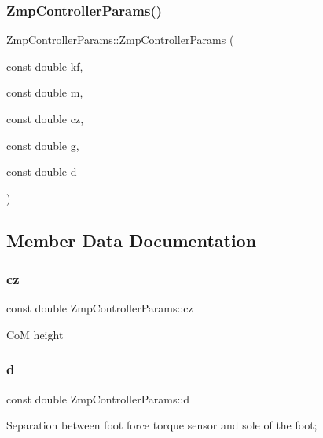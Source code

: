 \subsubsection{\texorpdfstring{Zmp\+Controller\+Params()}{ZmpControllerParams()}}
{\footnotesize\ttfamily Zmp\+Controller\+Params\+::\+Zmp\+Controller\+Params (\begin{DoxyParamCaption}\item[{const double}]{kf,  }\item[{const double}]{m,  }\item[{const double}]{cz,  }\item[{const double}]{g,  }\item[{const double}]{d }\end{DoxyParamCaption})\hspace{0.3cm}{\ttfamily [inline]}}



\subsection{Member Data Documentation}
\hypertarget{structZmpControllerParams_ae0d24b7bdae3eb228b9db827934d0e87}{}\label{structZmpControllerParams_ae0d24b7bdae3eb228b9db827934d0e87} 
\subsubsection{\texorpdfstring{cz}{cz}}
{\footnotesize\ttfamily const double Zmp\+Controller\+Params\+::cz}

CoM height \hypertarget{structZmpControllerParams_a00f5d68e5a1215bbe7b722375d95d243}{}\label{structZmpControllerParams_a00f5d68e5a1215bbe7b722375d95d243} 
\subsubsection{\texorpdfstring{d}{d}}
{\footnotesize\ttfamily const double Zmp\+Controller\+Params\+::d}

Separation between foot force torque sensor and sole of the foot; \hypertarget{structZmpControllerParams_af97a6bcc6b60e8372dd444d695d705f7}{}\label{structZmpControllerParams_af97a6bcc6b60e8372dd444d695d705f7} 
